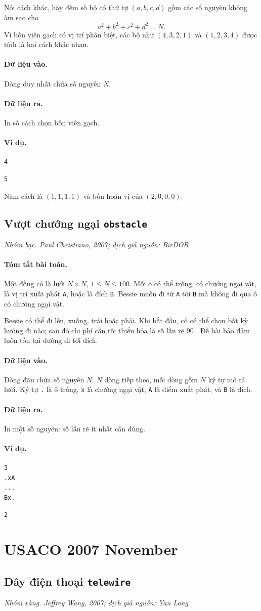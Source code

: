 \documentclass[11pt]{article}
\newcommand{\problem}[4]{%
  \subsection[#1 (#2)]{#1 \hfill {\normalsize\texttt{#2}}}%
  \noindent\textit{#3. #4}\par\smallskip
}
\newcommand{\iosec}[1]{\paragraph{#1}}
\begin{document}
Nói cách khác, hãy đếm số bộ có thứ tự \((a,b,c,d)\) gồm các số nguyên không
âm sao cho
\[
  a^2+b^2+c^2+d^2=N.
\]
Vì bốn viên gạch có vị trí phân biệt, các bộ như \((4,3,2,1)\) và
\((1,2,3,4)\) được tính là hai cách khác nhau.

\iosec{Dữ liệu vào.}
Dòng duy nhất chứa số nguyên \(N\).

\iosec{Dữ liệu ra.}
In số cách chọn bốn viên gạch.

\iosec{Ví dụ.}
\begin{verbatim}
4
\end{verbatim}

\begin{verbatim}
5
\end{verbatim}

Năm cách là \((1,1,1,1)\) và bốn hoán vị của \((2,0,0,0)\).

\problem{Vượt chướng ngại}{obstacle}{Nhóm bạc}{Paul Christiano, 2007; dịch giả nguồn: BirDOR}

\iosec{Tóm tắt bài toán.}
Một đồng cỏ là lưới \(N\times N\), \(1\le N\le 100\). Mỗi ô có thể trống,
có chướng ngại vật, là vị trí xuất phát \texttt{A}, hoặc là đích
\texttt{B}. Bessie muốn đi từ \texttt{A} tới \texttt{B} mà không đi qua ô có
chướng ngại vật.

Bessie có thể đi lên, xuống, trái hoặc phải. Khi bắt đầu, cô có thể chọn bất
kỳ hướng đi nào; sau đó chi phí cần tối thiểu hóa là số lần rẽ \(90^\circ\).
Đề bài bảo đảm luôn tồn tại đường đi tới đích.

\iosec{Dữ liệu vào.}
Dòng đầu chứa số nguyên \(N\). \(N\) dòng tiếp theo, mỗi dòng gồm \(N\) ký tự
mô tả lưới. Ký tự \texttt{.} là ô trống, \texttt{x} là chướng ngại vật,
\texttt{A} là điểm xuất phát, và \texttt{B} là đích.

\iosec{Dữ liệu ra.}
In một số nguyên: số lần rẽ ít nhất cần dùng.

\iosec{Ví dụ.}
\begin{verbatim}
3
.xA
...
Bx.
\end{verbatim}

\begin{verbatim}
2
\end{verbatim}

\section{USACO 2007 November}

\problem{Dây điện thoại}{telewire}{Nhóm vàng}{Jeffrey Wang, 2007; dịch giả nguồn: Yan Long}
\end{document}
